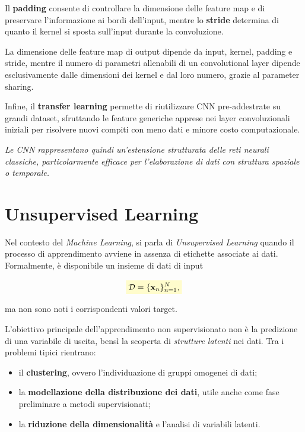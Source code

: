 \documentclass[a4paper,12pt]{report}
\newcommand{\highlight}[1]{%
\colorbox{yellow!20}{$\displaystyle #1$}%
}
\begin{document}
\begin{tcolorbox}[
    colback=green!5,
    colframe=green!50!black,
    title=Convolutional Neural Networks,
    breakable
]
Il \textbf{padding} consente di controllare la dimensione delle feature map e di preservare l’informazione ai bordi dell’input, mentre lo \textbf{stride} determina di quanto il kernel si sposta sull’input durante la convoluzione.

La dimensione delle feature map di output dipende da input, kernel, padding e stride, mentre il numero di parametri allenabili di un convolutional layer dipende esclusivamente dalle dimensioni dei kernel e dal loro numero, grazie al parameter sharing.

Infine, il \textbf{transfer learning} permette di riutilizzare CNN pre-addestrate su grandi dataset, sfruttando le feature generiche apprese nei layer convoluzionali iniziali per risolvere nuovi compiti con meno dati e minore costo computazionale.

\medskip
\textit{Le CNN rappresentano quindi un’estensione strutturata delle reti neurali classiche, particolarmente efficace per l’elaborazione di dati con struttura spaziale o temporale.}

\end{tcolorbox}


\chapter{Unsupervised Learning}

Nel contesto del \emph{Machine Learning}, si parla di \emph{Unsupervised Learning} quando il processo di apprendimento avviene in assenza di etichette associate ai dati.
Formalmente, è disponibile un insieme di dati di input

\[
\highlight{
\mathcal{D} = \{ \mathbf{x}_n \}_{n=1}^{N},}
\]

ma non sono noti i corrispondenti valori target.

L’obiettivo principale dell’apprendimento non supervisionato non è la predizione di una variabile di uscita, bensì la scoperta di \emph{strutture latenti} nei dati.
Tra i problemi tipici rientrano:
\begin{itemize}
    \item il \textbf{clustering}, ovvero l’individuazione di gruppi omogenei di dati;
    \item la \textbf{modellazione della distribuzione dei dati}, utile anche come fase preliminare a metodi supervisionati;
    \item la \textbf{riduzione della dimensionalità} e l’analisi di variabili latenti.
\end{itemize}
\end{document}
